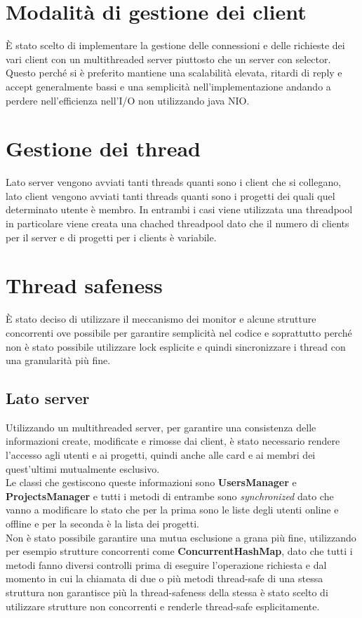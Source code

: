 \documentclass[11pt]{report}
\begin{document}
	\section{Modalità di gestione dei client}
	È stato scelto di implementare la gestione delle connessioni e delle richieste dei vari client con un multithreaded server piuttosto che un server con selector.
	Questo perché si è preferito mantiene una scalabilità elevata, ritardi di reply e accept generalmente bassi e una semplicità nell'implementazione andando a perdere nell'efficienza nell'I/O non utilizzando java NIO.
	
	\section{Gestione dei thread}
	Lato server vengono avviati tanti threads quanti sono i client che si collegano, lato client vengono avviati tanti threads quanti sono i progetti dei quali quel determinato utente è membro.
	In entrambi i casi viene utilizzata una threadpool in particolare viene creata una chached threadpool dato che il numero di clients per il server e di progetti per i clients è variabile.
	
	\section{Thread safeness}
	È stato deciso di utilizzare il meccanismo dei monitor e alcune strutture concorrenti ove possibile per garantire semplicità nel codice e soprattutto perché non è stato possibile utilizzare lock esplicite e quindi sincronizzare i thread con una granularità più fine.
	
	\subsection{Lato server}
	Utilizzando un multithreaded server, per garantire una consistenza delle informazioni create, modificate e rimosse dai client, è stato necessario rendere l'accesso agli utenti e ai progetti, quindi anche alle card e ai membri dei quest'ultimi mutualmente esclusivo.\\
	Le classi che gestiscono queste informazioni sono \textbf{UsersManager} e \textbf{ProjectsManager} e tutti i metodi di entrambe sono \textit{synchronized} dato che vanno a modificare lo stato che per la prima sono le liste degli utenti online e offline e per la seconda è la lista dei progetti.\\
	Non è stato possibile garantire una mutua esclusione a grana più fine, utilizzando per esempio strutture concorrenti come \textbf{ConcurrentHashMap}, dato che tutti i metodi fanno diversi controlli prima di eseguire l'operazione richiesta e dal momento in cui la chiamata di due o più metodi thread-safe di una stessa struttura non garantisce più la thread-safeness della stessa è stato scelto di utilizzare strutture non concorrenti e renderle thread-safe esplicitamente.
	
\end{document}
